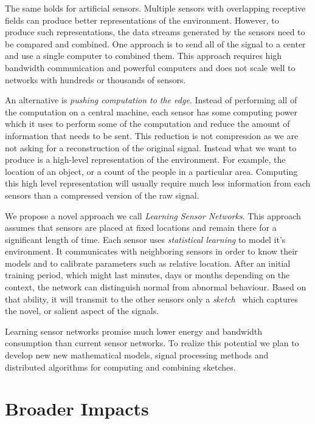 \documentclass{article}
\begin{document}
The same holds for artificial sensors. Multiple sensors with
overlapping receptive fields can produce better representations of the
environment. However, to produce such representations, the data
streams generated by the sensors need to be compared and combined. One
approach is to send all of the signal to a center and use a single
computer to combined them. This approach requires high bandwidth
communication and powerful computers and does not scale well to
networks with hundreds or thousands of sensors.

An alternative is {\em pushing computation to the edge}. Instead of
performing all of the computation on a central machine, each sensor
has some computing power which it uses to perform some of the
computation and reduce the amount of information that needs to be
sent. This reduction is not compression as we are not asking for a
reconstruction of the original signal. Instead what we want to produce
is a high-level representation of the environment. For example, the
location of an object, or a count of the people in a particular
area. Computing this high level representation will usually require
much less information from each sensors than a compressed version of
the raw signal.

We propose a novel approach we call {\em Learning Sensor Networks}.
This approach assumes that sensors are placed at fixed locations and
remain there for a significant length of time.  Each sensor uses {\em
  statistical learning} to model it's environment. It communicates
with neighboring sensors in order to know their models and to
calibrate parameters such as relative location. After an initial
training period, which might last minutes, days or months depending on
the context, the network can distinguish normal from abnormal
behaviour. Based on that ability, it will transmit to the other
sensors only a {\em sketch}~\cite{} which captures the novel, or
salient aspect of the signals.

Learning sensor networks promise much lower energy and bandwidth
consumption than current sensor networks. To realize this potential we
plan to develop new new mathematical models, signal processing methods
and distributed algorithms for computing and combining sketches.
\fi



\section{Broader Impacts}
\end{document}
